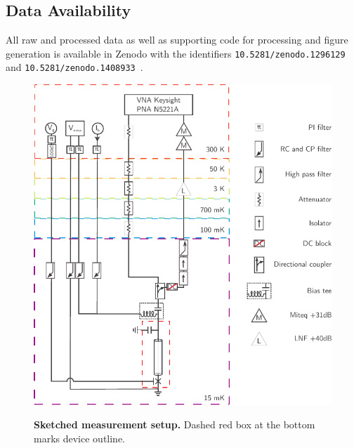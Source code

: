 \subsection{Data Availability}
All raw and processed data as well as supporting code for processing and figure generation is available in Zenodo with the identifiers \verb|10.5281/zenodo.1296129|~\cite{schmidtDataCodeBallistic2018} and \verb|10.5281/zenodo.1408933|~\cite{jenkinsMeasurementAnalysisScripts2018}.


%



\clearpage
\pagebreak



\begin{figure}[]
	{\centering
		\includegraphics[width=\linewidth]{chapter-gJJ/figs/full_setup_cmyk}}
	\caption{{\bf Sketched measurement setup.}
		Dashed red box at the bottom marks device outline.
	}
	\label{fig:setup_full}
\end{figure}

